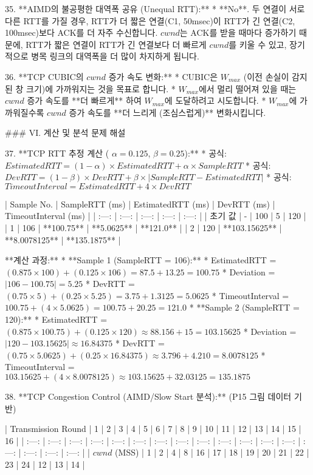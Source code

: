 35. **AIMD의 불공평한 대역폭 공유 (Unequal RTT):**
    *   **No**. 두 연결이 서로 다른 RTT를 가질 경우, RTT가 더 짧은 연결(C1, 50msec)이 RTT가 긴 연결(C2, 100msec)보다 ACK를 더 자주 수신합니다. $cwnd$는 ACK를 받을 때마다 증가하기 때문에, RTT가 짧은 연결이 RTT가 긴 연결보다 더 빠르게 $cwnd$를 키울 수 있고, 장기적으로 병목 링크의 대역폭을 더 많이 차지하게 됩니다.

36. **TCP CUBIC의 $cwnd$ 증가 속도 변화:**
    *   CUBIC은 $W_{max}$ (이전 손실이 감지된 창 크기)에 가까워지는 것을 목표로 합니다.
    *   $W_{max}$에서 멀리 떨어져 있을 때는 $cwnd$ 증가 속도를 **더 빠르게** 하여 $W_{max}$에 도달하려고 시도합니다.
    *   $W_{max}$에 가까워질수록 $cwnd$ 증가 속도를 **더 느리게 (조심스럽게)** 변화시킵니다.

### VI. 계산 및 분석 문제 해설

37. **TCP RTT 추정 계산 ( $\alpha = 0.125$, $\beta = 0.25$):**
    *   공식: $EstimatedRTT = (1-\alpha) \times EstimatedRTT + \alpha \times SampleRTT$
    *   공식: $DevRTT = (1-\beta) \times DevRTT + \beta \times |SampleRTT - EstimatedRTT|$
    *   공식: $TimeoutInterval = EstimatedRTT + 4 \times DevRTT$

| Sample No. | SampleRTT (ms) | EstimatedRTT (ms) | DevRTT (ms) | TimeoutInterval (ms) |
| :---: | :---: | :---: | :---: | :---: |
| 초기 값 | - | 100 | 5 | 120 |
| 1 | 106 | **100.75** | **5.0625** | **121.0** |
| 2 | 120 | **103.15625** | **8.0078125** | **135.1875** |

**계산 과정:**
*   **Sample 1 (SampleRTT = 106):**
    *   EstimatedRTT = $(0.875 \times 100) + (0.125 \times 106) = 87.5 + 13.25 = 100.75$
    *   Deviation = $|106 - 100.75| = 5.25$
    *   DevRTT = $(0.75 \times 5) + (0.25 \times 5.25) = 3.75 + 1.3125 = 5.0625$
    *   TimeoutInterval = $100.75 + (4 \times 5.0625) = 100.75 + 20.25 = 121.0$
*   **Sample 2 (SampleRTT = 120):**
    *   EstimatedRTT = $(0.875 \times 100.75) + (0.125 \times 120) \approx 88.156 + 15 = 103.15625$
    *   Deviation = $|120 - 103.15625| \approx 16.84375$
    *   DevRTT = $(0.75 \times 5.0625) + (0.25 \times 16.84375) \approx 3.796 + 4.210 = 8.0078125$
    *   TimeoutInterval = $103.15625 + (4 \times 8.0078125) \approx 103.15625 + 32.03125 = 135.1875$

38. **TCP Congestion Control (AIMD/Slow Start 분석):** (P15 그림 데이터 기반)

| Transmission Round | 1 | 2 | 3 | 4 | 5 | 6 | 7 | 8 | 9 | 10 | 11 | 12 | 13 | 14 | 15 | 16 |
| :---: | :---: | :---: | :---: | :---: | :---: | :---: | :---: | :---: | :---: | :---: | :---: | :---: | :---: | :---: | :---: | :---: |
| $cwnd$ (MSS) | 1 | 2 | 4 | 8 | 16 | 17 | 18 | 19 | 20 | 21 | 22 | 23 | 24 | 12 | 13 | 14 |

